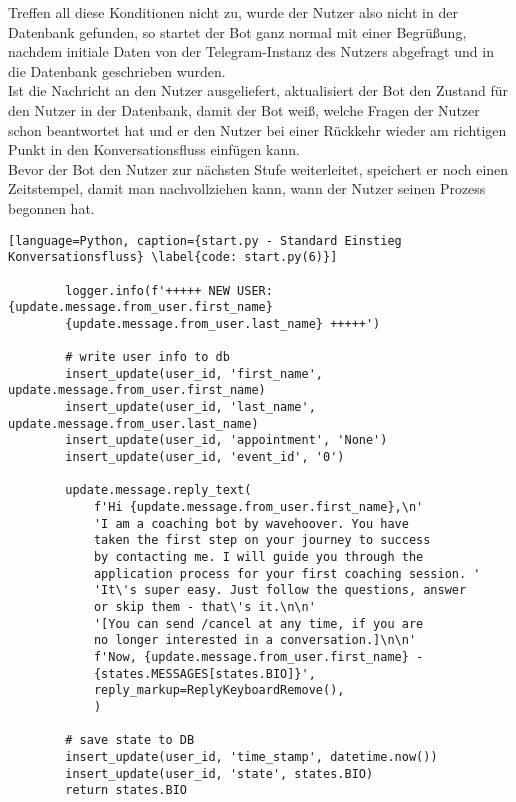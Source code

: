             Treffen all diese Konditionen nicht zu, wurde der Nutzer also nicht in der Datenbank gefunden, so startet der Bot ganz normal mit einer Begrüßung, nachdem initiale Daten von der Telegram-Instanz des Nutzers abgefragt und in die Datenbank geschrieben wurden. \\
            Ist die Nachricht an den Nutzer ausgeliefert, aktualisiert der Bot den Zustand für den Nutzer in der Datenbank, damit der Bot weiß, welche Fragen der Nutzer schon beantwortet hat und er den Nutzer bei einer Rückkehr wieder am richtigen Punkt in den Konversationsfluss einfügen kann.\\
            Bevor der Bot den Nutzer zur nächsten Stufe weiterleitet, speichert er noch einen Zeitstempel, damit man nachvollziehen kann, wann der Nutzer seinen Prozess begonnen hat.
            \begin{lstlisting}[language=Python, caption={start.py - Standard Einstieg Konversationsfluss} \label{code: start.py(6)}]

        logger.info(f'+++++ NEW USER: {update.message.from_user.first_name} 
        {update.message.from_user.last_name} +++++')

        # write user info to db
        insert_update(user_id, 'first_name', update.message.from_user.first_name) 
        insert_update(user_id, 'last_name', update.message.from_user.last_name)
        insert_update(user_id, 'appointment', 'None')
        insert_update(user_id, 'event_id', '0')

        update.message.reply_text(
            f'Hi {update.message.from_user.first_name},\n'
            'I am a coaching bot by wavehoover. You have 
            taken the first step on your journey to success 
            by contacting me. I will guide you through the 
            application process for your first coaching session. '
            'It\'s super easy. Just follow the questions, answer 
            or skip them - that\'s it.\n\n'
            '[You can send /cancel at any time, if you are 
            no longer interested in a conversation.]\n\n'
            f'Now, {update.message.from_user.first_name} - 
            {states.MESSAGES[states.BIO]}',
            reply_markup=ReplyKeyboardRemove(),
            )

        # save state to DB
        insert_update(user_id, 'time_stamp', datetime.now())
        insert_update(user_id, 'state', states.BIO)
        return states.BIO
            \end{lstlisting}

